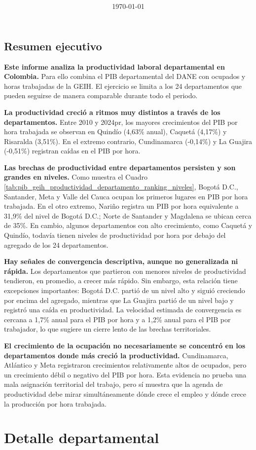 \documentclass[12pt, a4paper]{article}
\title{\reporttitle\\\reportsubtitle}
\author{\reportauthorone \and \reportauthortwo}
\date{\today}
\begin{document}


\begin{mdframed}[
  linewidth=1pt,
  linecolor=gray!60,
  backgroundcolor=gray!6,
  innertopmargin=12pt,
  innerbottommargin=12pt,
  innerleftmargin=14pt,
  innerrightmargin=14pt
]
\section*{Resumen ejecutivo}

\textbf{Este informe analiza la productividad laboral departamental en Colombia.} Para ello combina el PIB departamental del DANE con ocupados y horas trabajadas de la GEIH. El ejercicio se limita a los 24 departamentos que pueden seguirse de manera comparable durante todo el periodo.

\textbf{La productividad creció a ritmos muy distintos a través de los departamentos.} Entre 2010 y 2024pr, los mayores crecimientos del PIB por hora trabajada se observan en Quindío (4,63\% anual), Caquetá (4,17\%) y Risaralda (3,51\%). En el extremo contrario, Cundinamarca (-0,14\%) y La Guajira (-0,51\%) registran caídas en el PIB por hora.

\textbf{Las brechas de productividad entre departamentos persisten y son grandes en niveles.} Como muestra el Cuadro \ref{tab:pib_geih_productividad_departamento_ranking_niveles}, Bogotá D.C., Santander, Meta y Valle del Cauca ocupan los primeros lugares en PIB por hora trabajada. En el otro extremo, Nariño registra un PIB por hora equivalente a 31,9\% del nivel de Bogotá D.C.; Norte de Santander y Magdalena se ubican cerca de 35\%. En cambio, algunos departamentos con alto crecimiento, como Caquetá y Quindío, todavía tienen niveles de productividad por hora por debajo del agregado de los 24 departamentos.

\textbf{Hay señales de convergencia descriptiva, aunque no generalizada ni rápida.} Los departamentos que partieron con menores niveles de productividad tendieron, en promedio, a crecer más rápido. Sin embargo, esta relación tiene excepciones importantes: Bogotá D.C. partió de un nivel alto y siguió creciendo por encima del agregado, mientras que La Guajira partió de un nivel bajo y registró una caída en productividad. La velocidad estimada de convergencia es cercana a 1,7\% anual para el PIB por hora y a 1,2\% anual para el PIB por trabajador, lo que sugiere un cierre lento de las brechas territoriales.

\textbf{El crecimiento de la ocupación no necesariamente se concentró en los departamentos donde más creció la productividad.} Cundinamarca, Atlántico y Meta registraron crecimientos relativamente altos de ocupados, pero un crecimiento débil o negativo del PIB por hora. Esta evidencia no prueba una mala asignación territorial del trabajo, pero sí muestra que la agenda de productividad debe mirar simultáneamente dónde crece el empleo y dónde crece la producción por hora trabajada.
\end{mdframed}

\newpage
\tableofcontents
\newpage



\appendix
\section{Detalle departamental}

\end{document}
